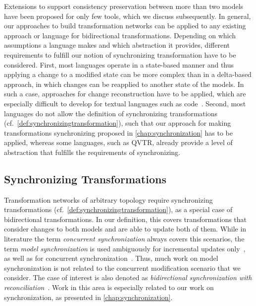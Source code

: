 Extensions to support consistency preservation between more than two models have been proposed for only few tools, which we discuss subsequently.
In general, our approaches to build transformation networks can be applied to any existing approach or language for bidirectional transformations.
Depending on which assumptions a language makes and which abstraction it provides, different requirements to fulfill our notion of synchronizing transformation have to be considered.
First, most languages operate in a state-based manner and thus applying a change to a modified state can be more complex than in a delta-based approach, in which changes can be reapplied to another state of the models. 
In such a case, approaches for change reconstruction have to be applied, which are especially difficult to develop for textual languages such as code~\cite{falleri2014codeDifferencing-ASE}.
Second, most languages do not allow the definition of synchronizing transformations (cf.\ \autoref{def:synchronizingtransformation}), such that our approach for making transformations synchronizing proposed in \autoref{chap:synchronization} has to be applied, whereas some languages, such as \gls{QVTR}, already provide a level of abstraction that fulfills the requirements of synchronizing.


\subsection{Synchronizing Transformations}

Transformation networks of arbitrary topology require synchronizing transformations (cf.\ \autoref{def:synchronizingtransformation}), as a special case of bidirectional transformations.
In our definition, this covers transformations that consider changes to both models and are able to update both of them.
While in literature the term \emph{concurrent synchronization} always covers this scenarios, the term \emph{model synchronization} is used ambiguously for incremental updates only~\cite{giese2009incrementalModelSynchronization-SoSym}, as well as for concurrent synchronization~\cite{samimi-dehkordi2015bidirectionalSynchronization-ICCKE}.
Thus, much work on model synchronization is not related to the concurrent modification scenario that we consider.
The case of interest is also denoted as \emph{bidirectional synchronization with reconciliation}~\cite{antkiewicz2008synchronizationDesignSpace-GTTSE}.
Work in this area is especially related to our work on synchronization, as presented in \autoref{chap:synchronization}.

